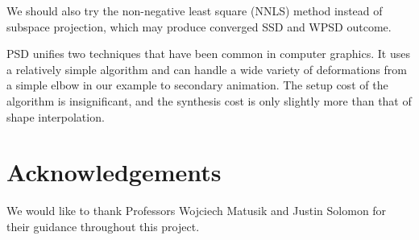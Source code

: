 \documentclass[11pt,twocolumn,letterpaper]{article}
\begin{document}
We should also try the non-negative least square (NNLS) method instead of subspace projection, which may produce converged SSD and WPSD outcome.

PSD unifies two techniques that have been common in computer graphics. It uses a relatively simple algorithm and can handle a wide variety of deformations from a simple elbow in our example to secondary animation. The setup cost of the algorithm is insignificant, and the synthesis cost is only slightly more than that of shape interpolation.

\section*{Acknowledgements}

We would like to thank Professors Wojciech Matusik and Justin Solomon for their guidance throughout this project.



\end{document}
